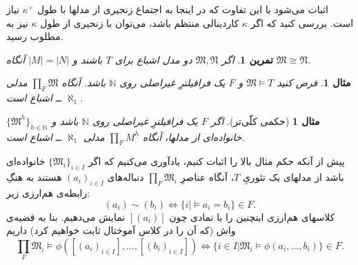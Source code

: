 \documentclass[12pt,a4paper]{report}
\theoremstyle{colorhead}
\newtheorem{tam}{تمرین}
\newtheorem{mesal}[thm]{مثال}
\begin{document}
اثبات می‌شود با این تفاوت که
در اینجا به اجتماع زنجیری از مدلها با طول
$\kappa^+$
نیاز است. بررسی کنید که اگر
$\kappa$
کاردینالی منتظم
 باشد، می‌توان با زنجیری از طول
$\kappa$
نیز به مطلوب رسید.
\begin{tam}
اگر
$\mathfrak{M},\mathfrak{N}$
دو مدل اشباع برای 
$T$
باشند و 
$|M|=|N|$
آنگاه 
$\mathfrak{M}\cong \mathfrak{N}$.
\end{tam}
\begin{mesal}
فرض کنید 
$\mathfrak{M}\models T$
و
$F$
یک فرافیلترِ غیراصلی روی
$\mathbb{N}$
باشد. آنگاه
$\prod_F \mathfrak{M}$
مدلی 
$\aleph_1$
ــ
اشباع است. 
\end{mesal}
\begin{mesal}[حکمی کلّی‌تر]
اگر
$F$
یک فرافیلترِ غیراصلی روی
$\mathbb{N}$
باشد و
$\{\mathfrak{M}^h\}_{h\in \mathbb{N}}$
خانواده‌ای از مدلها،‌ آنگاه
$\prod_F M^h$
مدلی
$\aleph_1$
ــ‌
اشباع است.
\end{mesal}
پیش از آنکه حکم مثال بالا را اثبات کنیم، یادآوری می‌کنیم که اگر
$\{\mathfrak{M}_i\}_{i\in I}$
خانواده‌ای باشد از مدلهای یک تئوریِ
$T$، 
آنگاه عناصرِ
$\prod_F \mathfrak{M}_i$
دنباله‌های
$(a_i)_{i\in I}$
هستند به هنگِ رابطه‌ی هم‌ارزی زیر:
\[
(a_i)\sim (b_i)\Leftrightarrow \{i|\models a_i=b_i\}\in F.
\]
کلاسهای هم‌ارزی اینچنین را با نمادی چون
$[(a_i)]$
نمایش می‌دهیم.  بنا به قضیه‌ی واش
 (که آن را در کلاس آموختال ثابت خواهیم کرد) داریم
 \[
 \prod_F \mathfrak{M}_i\models \phi([(a_i)_{i\in I}],\ldots,[(b_i)_{i\in I}])\Leftrightarrow \{i\in I|\mathfrak{M}_i\models \phi(a_i,\ldots,b_i)\}\in F.
 \]
\end{document}
